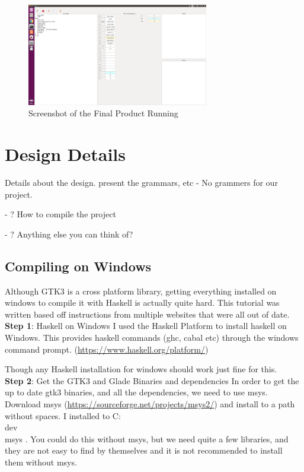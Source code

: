 \documentclass[10point]{article}
\begin{document}
\begin{figure}[h]
    \centering
    \includegraphics[width=300px]{screen_shot_running}
    \caption{Screenshot of the Final Product Running}
    \label{fig:screen_shot_running}
\end{figure}

\section{Design Details}
Details about the design.
present the grammars, etc - No grammers for our project.

- ? How to compile the project

- ? Anything else you can think of?

\subsection{Compiling on Windows}
Although GTK3 is a cross platform library, getting everything installed on windows to compile it with Haskell is actually quite hard. This tutorial was written based off instructions from multiple websites that were all out of date. 
\linebreak \\
\textbf{Step 1}: Haskell on Windows
I used the Haskell Platform to install haskell on Windows. This provides haskell commands (ghc, cabal etc) through the windows command prompt. (\href{https://www.haskell.org/platform/}{https://www.haskell.org/platform/})

\noindent Though any Haskell installation for windows should work just fine for this.
\linebreak \\
\textbf{Step 2}: Get the GTK3 and Glade Binaries and dependencies
In order to get the up to date gtk3 binaries, and all the dependencies, we need to use msys. Download msys (\href{https://sourceforge.net/projects/msys2/}{https://sourceforge.net/projects/msys2/}) and install to a path without spaces. I installed to C:\\dev\\msys . You could do this without msys, but we need quite a few libraries, and they are not easy to find by themselves and it is not recommended to install them without msys.
\end{document}
